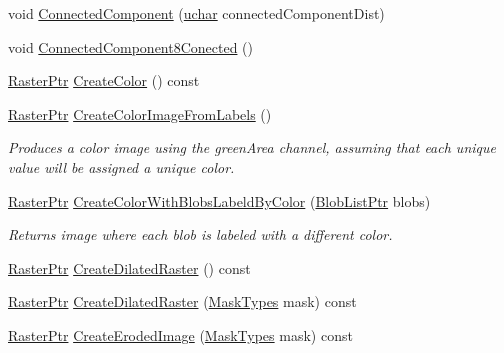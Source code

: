 \begin{DoxyCompactItemize}
void \hyperlink{class_k_k_b_1_1_raster_a3062e4d08b104319c1da0561017eb6f7}{Connected\+Component} (\hyperlink{namespace_k_k_b_ace9969169bf514f9ee6185186949cdf7}{uchar} connected\+Component\+Dist)
\item 
void \hyperlink{class_k_k_b_1_1_raster_af5bce18047f6f93accafcc4f6fa0f8f3}{Connected\+Component8\+Conected} ()
\item 
\hyperlink{class_k_k_b_1_1_raster_aefa532857fd6aa9eb53f79da55a97c5a}{Raster\+Ptr} \hyperlink{class_k_k_b_1_1_raster_ad9aafcf75ace95ae4e5170ffa5b44f0d}{Create\+Color} () const 
\item 
\hyperlink{class_k_k_b_1_1_raster_aefa532857fd6aa9eb53f79da55a97c5a}{Raster\+Ptr} \hyperlink{class_k_k_b_1_1_raster_a2161a69c86313baeff5d21f66cd9efd7}{Create\+Color\+Image\+From\+Labels} ()
\begin{DoxyCompactList}\small\item\em Produces a color image using the \textquotesingle{}green\+Area\textquotesingle{} channel, assuming that each unique value will be assigned a unique color. \end{DoxyCompactList}\item 
\hyperlink{class_k_k_b_1_1_raster_aefa532857fd6aa9eb53f79da55a97c5a}{Raster\+Ptr} \hyperlink{class_k_k_b_1_1_raster_a8c410f4489fcff95c0041e94ccebd504}{Create\+Color\+With\+Blobs\+Labeld\+By\+Color} (\hyperlink{namespace_k_k_b_a43f0fcfaef97a91bc290134c9a407d4d}{Blob\+List\+Ptr} blobs)
\begin{DoxyCompactList}\small\item\em Returns image where each blob is labeled with a different color. \end{DoxyCompactList}\item 
\hyperlink{class_k_k_b_1_1_raster_aefa532857fd6aa9eb53f79da55a97c5a}{Raster\+Ptr} \hyperlink{class_k_k_b_1_1_raster_add28bd664fc2962aed6631d157a37aa6}{Create\+Dilated\+Raster} () const 
\item 
\hyperlink{class_k_k_b_1_1_raster_aefa532857fd6aa9eb53f79da55a97c5a}{Raster\+Ptr} \hyperlink{class_k_k_b_1_1_raster_a388b0f8522bf7d89833398a08e534190}{Create\+Dilated\+Raster} (\hyperlink{class_k_k_b_1_1_morph_op_a9eaa0383bf9e046da208af397e7e35eb}{Mask\+Types} mask) const 
\item 
\hyperlink{class_k_k_b_1_1_raster_aefa532857fd6aa9eb53f79da55a97c5a}{Raster\+Ptr} \hyperlink{class_k_k_b_1_1_raster_a026621d5d9e30567daa0062c57a05d54}{Create\+Eroded\+Image} (\hyperlink{class_k_k_b_1_1_morph_op_a9eaa0383bf9e046da208af397e7e35eb}{Mask\+Types} mask) const 
\item 

\end{DoxyCompactItemize}

